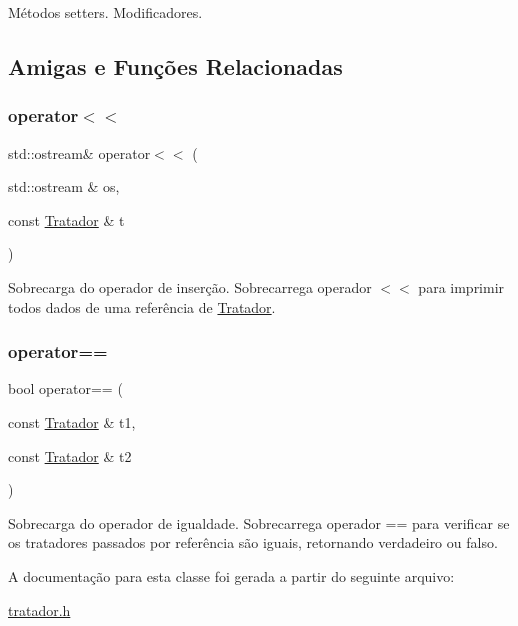 Métodos setters. Modificadores. 

\subsection{Amigas e Funções Relacionadas}
\mbox{\label{classTratador_aada884c6ae0506846e62abbc6a58ec54}} 
\subsubsection{\texorpdfstring{operator$<$$<$}{operator<<}}
{\footnotesize\ttfamily std\+::ostream\& operator$<$$<$ (\begin{DoxyParamCaption}\item[{std\+::ostream \&}]{os,  }\item[{const \hyperlink{classTratador}{Tratador} \&}]{t }\end{DoxyParamCaption})\hspace{0.3cm}{\ttfamily [friend]}}

Sobrecarga do operador de inserção. Sobrecarrega operador $<$$<$ para imprimir todos dados de uma referência de \hyperlink{classTratador}{Tratador}. \mbox{\label{classTratador_ae50323b07338c89b5c0f5c7c93d022ae}} 
\subsubsection{\texorpdfstring{operator==}{operator==}}
{\footnotesize\ttfamily bool operator== (\begin{DoxyParamCaption}\item[{const \hyperlink{classTratador}{Tratador} \&}]{t1,  }\item[{const \hyperlink{classTratador}{Tratador} \&}]{t2 }\end{DoxyParamCaption})\hspace{0.3cm}{\ttfamily [friend]}}

Sobrecarga do operador de igualdade. Sobrecarrega operador == para verificar se os tratadores passados por referência são iguais, retornando verdadeiro ou falso. 

A documentação para esta classe foi gerada a partir do seguinte arquivo\+:\begin{DoxyCompactItemize}
\item 
\hyperlink{tratador_8h}{tratador.\+h}\end{DoxyCompactItemize}
